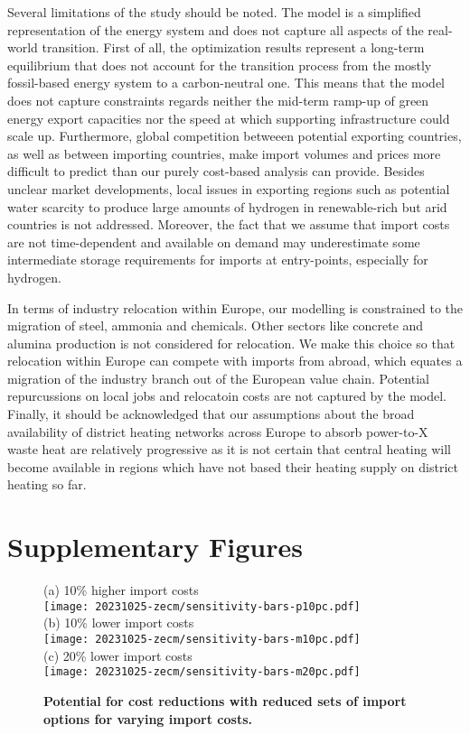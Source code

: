 Several limitations of the study should be noted. The model is a simplified
representation of the energy system and does not capture all aspects of the
real-world transition. First of all, the optimization results represent a
long-term equilibrium that does not account for the transition process from the
mostly fossil-based energy system to a carbon-neutral one. This means that the
model does not capture constraints regards neither the mid-term ramp-up of green
energy export capacities nor the speed at which supporting infrastructure could
scale up. Furthermore, global competition betweeen potential exporting
countries, as well as between importing countries, make import volumes and
prices more difficult to predict than our purely cost-based analysis can
provide. Besides unclear market developments, local issues in exporting regions
such as potential water scarcity to produce large amounts of hydrogen in
renewable-rich but arid countries is not addressed. Moreover, the fact that we
assume that import costs are not time-dependent and available on demand may
underestimate some intermediate storage requirements for imports at
entry-points, especially for hydrogen.

In terms of industry relocation within Europe, our modelling is constrained to
the migration of steel, ammonia and chemicals. Other sectors like concrete and
alumina production is not considered for relocation. We make this choice so that
relocation within Europe can compete with imports from abroad, which equates a
migration of the industry branch out of the European value chain. Potential
repurcussions on local jobs and relocatoin costs are not captured by the model.
Finally, it should be acknowledged that our assumptions about the broad
availability of district heating networks across Europe to absorb
\mbox{power-to-X} waste heat are relatively progressive as it is not certain
that central heating will become available in regions which have not based their
heating supply on district heating so far.


\newpage


\section*{Supplementary Figures}
\begin{figure}[!htb]
    \footnotesize
    (a) 10\% higher import costs \\
    \texttt{[image: 20231025-zecm/sensitivity-bars-p10pc.pdf]} \\
    (b) 10\% lower import costs \\
    \texttt{[image: 20231025-zecm/sensitivity-bars-m10pc.pdf]} \\
    (c) 20\% lower import costs \\
    \texttt{[image: 20231025-zecm/sensitivity-bars-m20pc.pdf]} \\
    \caption{\textbf{Potential for cost reductions with reduced sets of import options for varying import costs.}}
    \label{fig:si:subsets}
\end{figure}

